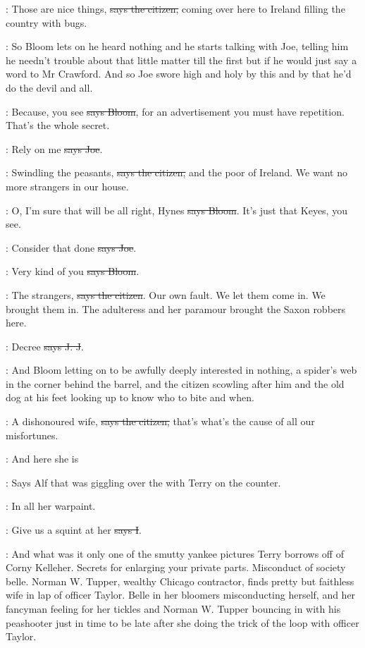 \citizen:
Those are nice things, \sout{says the citizen,}
coming over here to Ireland filling the country with bugs.

\Nq:
So Bloom lets on he heard nothing and he starts talking with Joe, telling
him he needn't trouble about that little matter till the first but if he
would just say a word to Mr Crawford. And so Joe swore high and holy by
this and by that he'd do the devil and all.

\Bloom:
Because, you see \sout{says Bloom},
for an advertisement you must have
repetition. That's the whole secret.

\joe:
Rely on me \sout{says Joe}.

\citizen:
Swindling the peasants, \sout{says the citizen,}
and the poor of Ireland. We
want no more strangers in our house.

\Bloom:
O, I'm sure that will be all right,
Hynes \sout{says Bloom}. It's just that
Keyes, you see.

\joe:
Consider that done \sout{says Joe}.

\Bloom:
Very kind of you \sout{says Bloom}.

\citizen:
The strangers, \sout{says the citizen}.
Our own fault. We let them come in. We
brought them in. The adulteress and her paramour brought the Saxon
robbers here.

\jjom:
Decree  \sout{says J. J}.

\Nq:
And Bloom letting on to be awfully deeply interested in nothing,
a
spider's web in the corner behind the barrel, and the citizen scowling
after him and the old dog at his feet looking up to know who to bite and
when.

\citizen:
A dishonoured wife, \sout{says the citizen,}
that's what's the cause of all our
misfortunes.

\bergan:
And here she is

\Nq:
Says Alf that was giggling over the 
with Terry on the counter.

\bergan:
In all her warpaint.

:
Give us a squint at her \sout{says I}.

\Nq:
And what was it only one of the smutty yankee pictures Terry
borrows off of Corny Kelleher. Secrets for enlarging your private parts.
Misconduct of society belle.
Norman W. Tupper, wealthy Chicago
contractor, finds pretty but faithless wife in lap of officer Taylor.
Belle in her bloomers misconducting herself, and her fancyman feeling for
her tickles and Norman W. Tupper bouncing in with his peashooter just in
time to be late after she doing the trick of the loop with officer Taylor.

